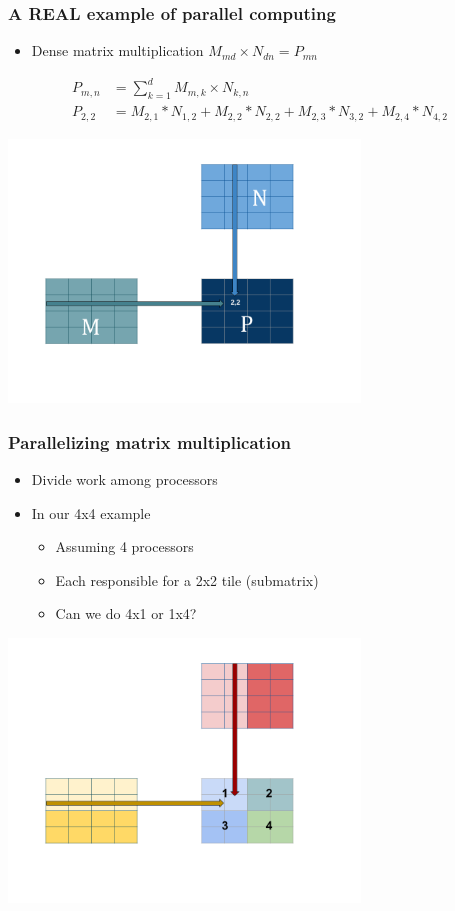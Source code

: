 \documentclass[10pt,t]{beamer}
\begin{document}
\begin{frame}
  \frametitle{A REAL example of parallel computing}
  \begin{itemize}
  \item Dense matrix multiplication $M_{md}\times{}N_{dn}=P_{mn}$
  \end{itemize}
  \begin{align*}
    P_{m,n} &= \sum_{k=1}^{d}M_{m,k}\times{}N_{k,n}\\
    P_{2,2} &= M_{2,1}*N_{1,2}+M_{2,2}*N_{2,2}+M_{2,3}*N_{3,2}+M_{2,4}*N_{4,2}
  \end{align*}
  \begin{center}
    \includegraphics[width=0.7\textwidth]{./MatMul}
  \end{center}
\end{frame}

\begin{frame}
  \frametitle{Parallelizing matrix multiplication}
  \begin{itemize}
  \item Divide work among processors
  \item In our 4x4 example
    \begin{itemize}
    \item Assuming 4 processors
    \item Each responsible for a 2x2 tile (submatrix)
    \item Can we do 4x1 or 1x4?
    \end{itemize}
  \end{itemize}
  \begin{center}
    \includegraphics[width=0.7\textwidth]{./ParMatMul}
  \end{center}
\end{frame}
\end{document}

